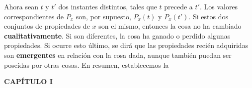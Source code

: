 {Ahora sean $t$ y $t'$ dos instantes distintos, tales que $t$ precede a $t'$. Los valores correspondientes de $P_x$ son, por supuesto, $P_x(t)$ y $P_x(t')$. Si estos dos conjuntos de propiedades de $x$ son el mismo, entonces la cosa no ha cambiado \textbf{cualitativamente}. Si son diferentes, la cosa ha ganado o perdido algunas propiedades. Si ocurre esto último, se dirá que las propiedades recién adquiridas son \textbf{emergentes} en relación con la cosa dada, aunque también puedan ser poseídas por otras cosas. En resumen, establecemos la
}

\newpage
\fancyhf{}
\fancyhead[l]{\thepage}
\begin{center}
{\fontsize{13}{16}\selectfont \textbf{CAPÍTULO I}}
\end{center}
\vspace{0.5cm}

